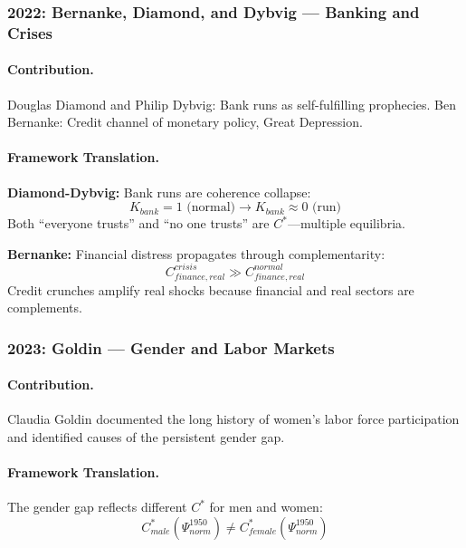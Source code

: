 \subsubsection{2022: Bernanke, Diamond, and Dybvig --- Banking and Crises}

\paragraph{Contribution.}
Douglas Diamond and Philip Dybvig: Bank runs as self-fulfilling prophecies.
Ben Bernanke: Credit channel of monetary policy, Great Depression.

\paragraph{Framework Translation.}
\textbf{Diamond-Dybvig:} Bank runs are coherence collapse:
\begin{equation}
  K_{bank} = 1 \text{ (normal)} \to K_{bank} \approx 0 \text{ (run)}
\end{equation}
Both ``everyone trusts'' and ``no one trusts'' are $C^*$---multiple equilibria.

\textbf{Bernanke:} Financial distress propagates through complementarity:
\begin{equation}
  C_{finance, real}^{crisis} \gg C_{finance, real}^{normal}
\end{equation}
Credit crunches amplify real shocks because financial and real sectors are complements.

\subsubsection{2023: Goldin --- Gender and Labor Markets}

\paragraph{Contribution.}
Claudia Goldin documented the long history of women's labor force participation
and identified causes of the persistent gender gap.

\paragraph{Framework Translation.}
The gender gap reflects different $C^*$ for men and women:
\begin{equation}
  C^*_{male}(\Psi_{norm}^{1950}) \neq C^*_{female}(\Psi_{norm}^{1950})
\end{equation}

